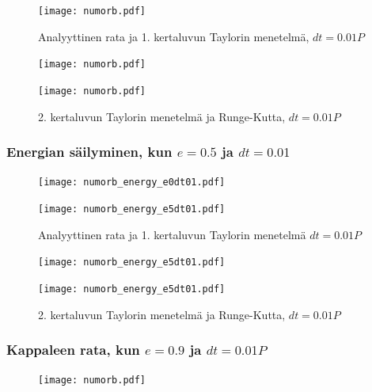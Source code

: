 \documentclass[12pt, a4paper]{article}
\begin{document}
\begin{figure}[H]%
\vspace*{-2.5cm}
\texttt{[image: numorb.pdf]}%
\caption{Analyyttinen rata ja 1. kertaluvun Taylorin menetelmä, $dt=0.01P$}
\end{figure}\label{t1e05}

\begin{figure}[H]%
\vspace*{-1.5cm}
\texttt{[image: numorb.pdf]}%
\end{figure}\label{t2e05}

\begin{figure}[H]%
\vspace*{-2.5cm}
\texttt{[image: numorb.pdf]}%
\caption{2. kertaluvun Taylorin menetelmä ja Runge-Kutta, $dt=0.01P$}
\end{figure}\label{rk4e05}

\newpage
\subsubsection{Energian säilyminen, kun $e=0.5$ ja $dt=0.01$}
\begin{figure}[H]
\vspace*{-1cm}
\texttt{[image: numorb\_energy\_e0dt01.pdf]}
\end{figure}

\begin{figure}[H]%
\vspace*{-2cm}
\texttt{[image: numorb\_energy\_e5dt01.pdf]}%
\caption{Analyyttinen rata ja 1. kertaluvun Taylorin menetelmä $dt=0.01P$}
\end{figure}

\newpage
\begin{figure}[H]%
\texttt{[image: numorb\_energy\_e5dt01.pdf]}%
\end{figure}

\begin{figure}[H]%
\vspace*{-2cm}
\texttt{[image: numorb\_energy\_e5dt01.pdf]}%
\caption{2. kertaluvun Taylorin menetelmä ja Runge-Kutta, $dt=0.01P$}
\end{figure}

\newpage
\subsubsection{Kappaleen rata, kun $e=0.9$ ja $dt=0.01P$}
\begin{figure}[H]%
\vspace*{-1.5cm}
\texttt{[image: numorb.pdf]}%
\end{figure}\label{ke09}
\end{document}
